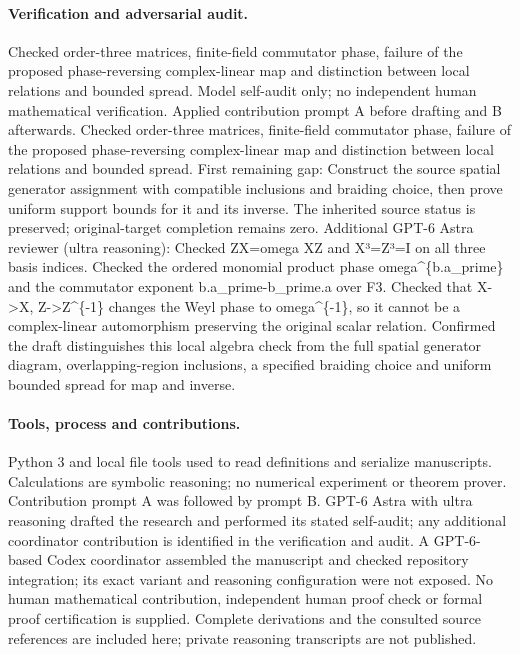 \documentclass[11pt]{article}
\begin{document}
\paragraph{Verification and adversarial audit.}
Checked order-three matrices, finite-field commutator phase, failure of the proposed phase-reversing complex-linear map and distinction between local relations and bounded spread. Model self-audit only; no independent human mathematical verification. Applied contribution prompt A before drafting and B afterwards. Checked order-three matrices, finite-field commutator phase, failure of the proposed phase-reversing complex-linear map and distinction between local relations and bounded spread. First remaining gap: Construct the source spatial generator assignment with compatible inclusions and braiding choice, then prove uniform support bounds for it and its inverse. The inherited source status is preserved; original-target completion remains zero. Additional GPT-6 Astra reviewer (ultra reasoning): Checked ZX=omega XZ and X³=Z³=I on all three basis indices. Checked the ordered monomial product phase omega\textasciicircum{}\{b.a\_prime\} and the commutator exponent b.a\_prime-b\_prime.a over F3. Checked that X->X, Z->Z\textasciicircum{}\{-1\} changes the Weyl phase to omega\textasciicircum{}\{-1\}, so it cannot be a complex-linear automorphism preserving the original scalar relation. Confirmed the draft distinguishes this local algebra check from the full spatial generator diagram, overlapping-region inclusions, a specified braiding choice and uniform bounded spread for map and inverse.

\paragraph{Tools, process and contributions.}
Python 3 and local file tools used to read definitions and serialize manuscripts. Calculations are symbolic reasoning; no numerical experiment or theorem prover. Contribution prompt A was followed by prompt B. GPT-6 Astra with ultra reasoning drafted the research and performed its stated self-audit; any additional coordinator contribution is identified in the verification and audit. A GPT-6-based Codex coordinator assembled the manuscript and checked repository integration; its exact variant and reasoning configuration were not exposed. No human mathematical contribution, independent human proof check or formal proof certification is supplied. Complete derivations and the consulted source references are included here; private reasoning transcripts are not published.
\end{document}

